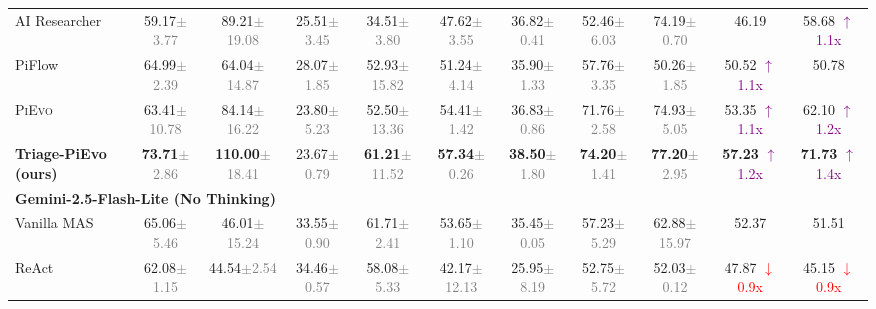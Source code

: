 \documentclass{article}
\newcommand{\pievo}{\textsc{PiEvo}\,}
\begin{document}
\begin{table}[!ht]
{\begin{tabular}{l | cc | cc | cc | cc | cc}
AI Researcher & 59.17\textcolor{gray}{\tiny$\pm$3.77} & 89.21\textcolor{gray}{\tiny$\pm$19.08} & 25.51\textcolor{gray}{\tiny$\pm$3.45} & 34.51\textcolor{gray}{\tiny$\pm$3.80} & 47.62\textcolor{gray}{\tiny$\pm$3.55} & 36.82\textcolor{gray}{\tiny$\pm$0.41} & 52.46\textcolor{gray}{\tiny$\pm$6.03} & 74.19\textcolor{gray}{\tiny$\pm$0.70} & 46.19 & 58.68 \textcolor{purple}{\small $\uparrow$ 1.1x} \\
PiFlow & 64.99\textcolor{gray}{\tiny$\pm$2.39} & 64.04\textcolor{gray}{\tiny$\pm$14.87} & 28.07\textcolor{gray}{\tiny$\pm$1.85} & 52.93\textcolor{gray}{\tiny$\pm$15.82} & 51.24\textcolor{gray}{\tiny$\pm$4.14} & 35.90\textcolor{gray}{\tiny$\pm$1.33} & 57.76\textcolor{gray}{\tiny$\pm$3.35} & 50.26\textcolor{gray}{\tiny$\pm$1.85} & 50.52 \textcolor{purple}{\small $\uparrow$ 1.1x} & 50.78 \\
\pievo{} & 63.41\textcolor{gray}{\tiny$\pm$10.78} & 84.14\textcolor{gray}{\tiny$\pm$16.22} & 23.80\textcolor{gray}{\tiny$\pm$5.23} & 52.50\textcolor{gray}{\tiny$\pm$13.36} & 54.41\textcolor{gray}{\tiny$\pm$1.42} & 36.83\textcolor{gray}{\tiny$\pm$0.86} & 71.76\textcolor{gray}{\tiny$\pm$2.58} & 74.93\textcolor{gray}{\tiny$\pm$5.05} & 53.35 \textcolor{purple}{\small $\uparrow$ 1.1x} & 62.10 \textcolor{purple}{\small $\uparrow$ 1.2x} \\
\textbf{Triage-PiEvo (ours)} & \textbf{73.71}\textcolor{gray}{\tiny$\pm$2.86} & \textbf{110.00}\textcolor{gray}{\tiny$\pm$18.41} & 23.67\textcolor{gray}{\tiny$\pm$0.79} & \textbf{61.21}\textcolor{gray}{\tiny$\pm$11.52} & \textbf{57.34}\textcolor{gray}{\tiny$\pm$0.26} & \textbf{38.50}\textcolor{gray}{\tiny$\pm$1.80} & \textbf{74.20}\textcolor{gray}{\tiny$\pm$1.41} & \textbf{77.20}\textcolor{gray}{\tiny$\pm$2.95} & \textbf{57.23} \textcolor{purple}{\small $\uparrow$ 1.2x} & \textbf{71.73} \textcolor{purple}{\small $\uparrow$ 1.4x} \\
\midrule
\multicolumn{11}{l}{\textbf{Gemini-2.5-Flash-Lite (No Thinking)}} \\
\midrule
Vanilla MAS & 65.06\textcolor{gray}{\tiny$\pm$5.46} & 46.01\textcolor{gray}{\tiny$\pm$15.24} & 33.55\textcolor{gray}{\tiny$\pm$0.90} & 61.71\textcolor{gray}{\tiny$\pm$2.41} & 53.65\textcolor{gray}{\tiny$\pm$1.10} & 35.45\textcolor{gray}{\tiny$\pm$0.05} & 57.23\textcolor{gray}{\tiny$\pm$5.29} & 62.88\textcolor{gray}{\tiny$\pm$15.97} & 52.37 & 51.51 \\
ReAct & 62.08\textcolor{gray}{\tiny$\pm$1.15} & 44.54\textcolor{gray}{\tiny$\pm$2.54} & 34.46\textcolor{gray}{\tiny$\pm$0.57} & 58.08\textcolor{gray}{\tiny$\pm$5.33} & 42.17\textcolor{gray}{\tiny$\pm$12.13} & 25.95\textcolor{gray}{\tiny$\pm$8.19} & 52.75\textcolor{gray}{\tiny$\pm$5.72} & 52.03\textcolor{gray}{\tiny$\pm$0.12} & 47.87 \textcolor{red}{\small $\downarrow$ 0.9x} & 45.15 \textcolor{red}{\small $\downarrow$ 0.9x} \\

\end{tabular}}
\end{table}
\end{document}
